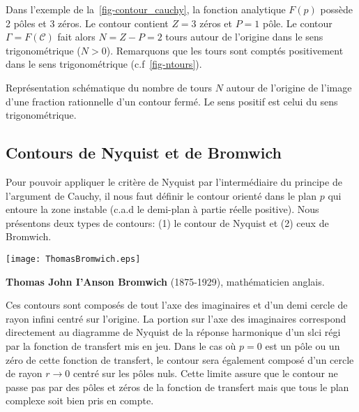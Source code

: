 Dans l'exemple de la~\cref{fig-contour_cauchy}, la fonction analytique $F(p)$ 
possède 2 pôles et 3 zéros. Le contour contient $Z=3$ zéros et $P=1$ pôle.
Le contour $\Gamma=F(\mathcal{C})$ fait alors $N=Z-P=2$ tours autour 
de l'origine dans le sens trigonométrique ($N>0$). Remarquons que les tours 
sont comptés positivement dans le sens trigonométrique (c.f~\cref{fig-ntours}).
\begin{marginfigure}
    \centering
    
    
    \caption{Représentation schématique du nombre de tours $N$ autour de 
             l'origine de l'image d'une fraction rationnelle d'un contour 
             fermé. Le sens positif est celui du sens trigonométrique.
             \label{fig-ntours}}
\end{marginfigure}
\subsection{Contours de Nyquist et de Bromwich}
Pour pouvoir appliquer le critère de Nyquist par l'intermédiaire du principe 
de l'argument de Cauchy, il nous faut définir le contour orienté dans le plan 
$p$ qui entoure la zone instable (c.a.d le demi-plan à partie réelle positive).
Nous présentons deux types de contours: (1) le contour de Nyquist et (2) ceux 
de Bromwich.
\begin{marginfigure}
    \centering
    \texttt{[image: ThomasBromwich.eps]} 
    \caption*{\textbf{Thomas John I'Anson Bromwich} 
             (1875-1929), mathématicien anglais.}
\end{marginfigure}
Ces contours sont composés de tout l'axe des imaginaires et 
d'un demi cercle de rayon infini centré sur l'origine. La portion sur l'axe 
des imaginaires correspond directement au diagramme de Nyquist
de la réponse harmonique d'un \gls{slci} régi par la fonction de transfert mis 
en jeu. Dans le cas où $p=0$ est un pôle ou un zéro de cette fonction
de transfert, le contour sera également composé d'un cercle de rayon   
$r\rightarrow0$ centré sur les pôles nuls. Cette limite assure que le contour
ne passe pas par des pôles et zéros de la fonction de transfert mais que tous
le plan complexe soit bien pris en compte.
\clearpage
